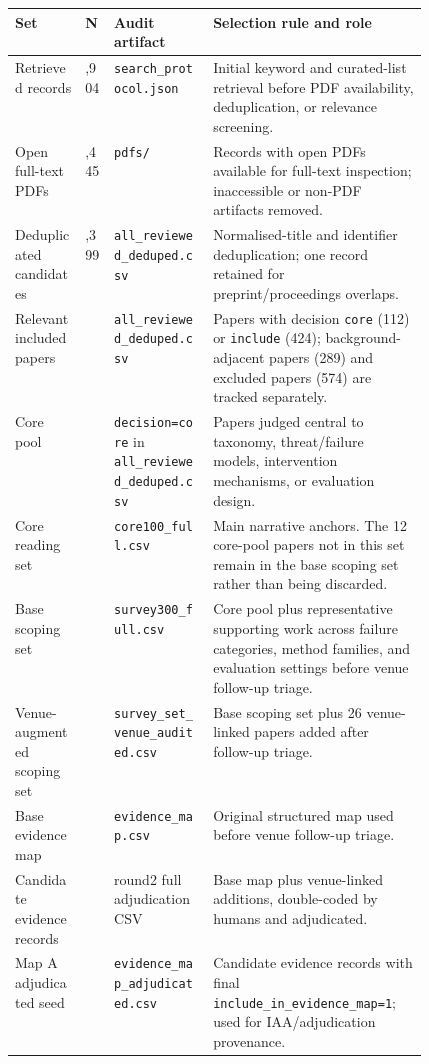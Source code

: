 \begin{table}[t]
\centering
\scriptsize
\renewcommand{\arraystretch}{0.92}
\begin{tabularx}{\linewidth}{>{\raggedright\arraybackslash}p{0.17\linewidth}>{\raggedleft\arraybackslash}p{0.07\linewidth}>{\raggedright\arraybackslash}p{0.24\linewidth}X}
\toprule
\textbf{Set} & \textbf{N} & \textbf{Audit artifact} & \textbf{Selection rule and role} \\
\midrule
Retrieved records & 1,904 & \texttt{search\_protocol.json} & Initial keyword and curated-list retrieval before PDF availability, deduplication, or relevance screening. \\
Open full-text PDFs & 1,445 & \texttt{pdfs/} & Records with open PDFs available for full-text inspection; inaccessible or non-PDF artifacts removed. \\
Deduplicated candidates & 1,399 & \texttt{all\_reviewed\_deduped.csv} & Normalised-title and identifier deduplication; one record retained for preprint/proceedings overlaps. \\
Relevant included papers & 536 & \texttt{all\_reviewed\_deduped.csv} & Papers with decision \texttt{core} (112) or \texttt{include} (424); background-adjacent papers (289) and excluded papers (574) are tracked separately. \\
Core pool & 112 & \texttt{decision=core} in \texttt{all\_reviewed\_deduped.csv} & Papers judged central to taxonomy, threat/failure models, intervention mechanisms, or evaluation design. \\
Core reading set & 100 & \texttt{core100\_full.csv} & Main narrative anchors. The 12 core-pool papers not in this set remain in the base scoping set rather than being discarded. \\
Base scoping set & 300 & \texttt{survey300\_full.csv} & Core pool plus representative supporting work across failure categories, method families, and evaluation settings before venue follow-up triage. \\
Venue-augmented scoping set & 326 & \texttt{survey\_set\_venue\_audited.csv} & Base scoping set plus 26 venue-linked papers added after follow-up triage. \\
Base evidence map & 250 & \texttt{evidence\_map.csv} & Original structured map used before venue follow-up triage. \\
Candidate evidence records & 274 & round2 full adjudication CSV & Base map plus venue-linked additions, double-coded by humans and adjudicated. \\
Map A adjudicated seed & 268 & \texttt{evidence\_map\_adjudicated.csv} & Candidate evidence records with final \texttt{include\_in\_evidence\_map=1}; used for IAA/adjudication provenance. \\

\end{tabularx}
\end{table}
